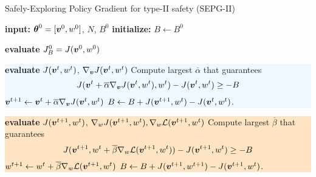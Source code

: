 \begin{algorithm}[t]
\caption{Safely-Exploring Policy Gradient for type-II safety (SEPG-II)}
    \label{alg:sepg-II}
    \begin{algorithmic}[1] 
	\State \textbf{input:} $\vtheta^0 = [\vv^0, w^0]$, $N$, $B^0$
        \State \textbf{initialize:} $B \gets B^0$
        
        \State \textbf{evaluate} $\jbase[0] = J(\vv^0, w^0)$
        \State\newline
        \hspace*{-\fboxsep}\colorbox{aliceblue}{\parbox{\linewidth}{
            \State \textbf{evaluate} $J(\vv^t,w^t)$, $\nabla_{\vv}{J(\vv^t,w^t)}$ 
			\State Compute largest $\overline{\alpha}$ that guarantees \[J(\vv^t + \overline{\alpha} \nabla_{\vv}J(\vv^t, w^t), w^t) - J(\vv^t, w^t) \geq -B\]
            \State $\vv^{t+1} \gets \vv^t + \overline{\alpha}\nabla_{\vv}{J(\vv^t, w^t)}$  
            \State $B \gets B + J(\vv^{t+1}, w^t) - J(\vv^t, w^t)$.}}

\State\newline
\hspace*{-\fboxsep}\colorbox{bisque}{\parbox{\linewidth}{
            
            \State \textbf{evaluate} $J(\vv^{t+1}, w^t)$, $\nabla_{w}{J(\vv^{t+1}, w^t)}, \gradDelta(\vv^{t+1},w^t)$ 
            \State Compute largest $\overline{\beta}$ that guarantees \[J(\vv^{t+1}, w^t + \overline{\beta} \gradDelta(\vv^{t+1}, w^t)) - J(\vv^{t+1}, w^t) \geq -B \]
            \State $w^{t+1} \gets w^t + \overline{ \beta}\gradDelta(\vv^{t+1},w^t)$             
            \State $B \gets B + J(\vv^{t+1}, w^{t+1}) - J(\vv^{t+1}, w^t)$. }}
        \EndFor
    \end{algorithmic}
\end{algorithm}


